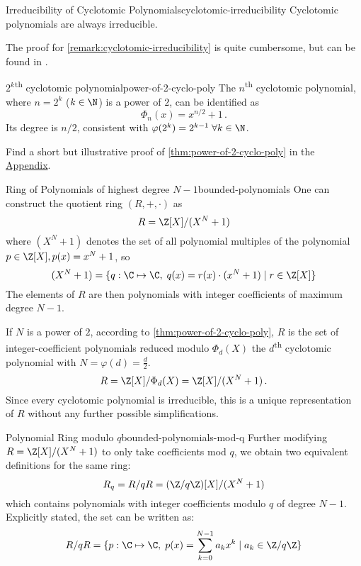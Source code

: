 \begin{remark}{Irreducibility of Cyclotomic Polynomials}{cyclotomic-irreducibility}
  Cyclotomic polynomials are always irreducible.
\end{remark}
The proof for \autoref{remark:cyclotomic-irreducibility} is quite cumbersome, but can be found in \cite{2002-serge-algebra}.

\begin{theorem}{$2^k$\textsuperscript{th} cyclotomic polynomial}{power-of-2-cyclo-poly}
  The $n$\textsuperscript{th} cyclotomic polynomial, where $n = 2^k$ ($k \in \N$) is a power of $2$,
  can be identified as
  $$\Phi_{n}(x) = x^{n/2} + 1\,.$$
  Its degree is $n/2$, consistent with $\varphi(2^k) = 2^{k-1} \; \forall k \in \N$.
\end{theorem}
Find a short but illustrative proof of \autoref{thm:power-of-2-cyclo-poly} in the \hyperref[chap:appendix]{Appendix}.

\begin{definition}{Ring of Polynomials of highest degree $N-1$}{bounded-polynomials}
  One can construct the quotient ring $(R, +, \cdot)$ as
  $$R = \Z[X] / (X^N + 1)$$
  where $(X^N + 1)$ denotes the set of all polynomial multiples of the polynomial $p \in \Z[X], p(x) = x^N + 1$, so
  $$(X^N+1) = \{q: \C \mapsto \C,\; q(x) = r(x) \cdot (x^N+1) \;|\; r \in \Z[X]\}$$
  The elements of $R$ are then polynomials with integer coefficients of maximum degree $N-1$.
\end{definition}

If $N$ is a power of $2$, according to \autoref{thm:power-of-2-cyclo-poly},
$R$ is the set of integer-coefficient polynomials reduced modulo $\Phi_d(X)$
the $d$\textsuperscript{th} cyclotomic polynomial with $N = \varphi(d) = \frac{d}{2}$.
$$R = \Z[X] / \Phi_d(X) = \Z[X] / (X^N + 1)\,.$$
Since every cyclotomic polynomial is irreducible, this is a unique representation of $R$
without any further possible simplifications.

\begin{corollary}{Polynomial Ring modulo $q$}{bounded-polynomials-mod-q}
  Further modifying $R = \Z[X] / (X^N+1)$ to only take coefficients mod $q$, we obtain two equivalent definitions
  for the same ring:
  $$R_q = R/qR = (\Z/q\Z)[X] / (X^N+1)$$
  which contains polynomials with integer coefficients modulo $q$ of degree $N-1$.
  Explicitly stated, the set can be written as:
  $$R/qR = \{p: \C \mapsto \C,\; p(x) = \sum_{k=0}^{N-1} a_k x^k \;|\; a_k \in \Z/q\Z\}$$
\end{corollary}


